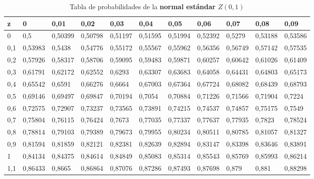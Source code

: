 \documentclass[addpoints,spanish, 12pt,a4paper]{exam}
\begin{document}
\begin{questions}

\end{questions}

\begin{table}
\centering

\caption{Tabla de probabilidades de la \textbf{normal estándar $Z(0,1)$}}
\label{my-label}

\begin{tabular}{l|llllllllll}
z   & 0       & 0,01    & 0,02    & 0,03    & 0,04    & 0,05    & 0,06    & 0,07    & 0,08    & 0,09    \\
\hline
0   & 0,5     & 0,50399 & 0,50798 & 0,51197 & 0,51595 & 0,51994 & 0,52392 & 0,5279  & 0,53188 & 0,53586 \\
0,1 & 0,53983 & 0,5438  & 0,54776 & 0,55172 & 0,55567 & 0,55962 & 0,56356 & 0,56749 & 0,57142 & 0,57535 \\
0,2 & 0,57926 & 0,58317 & 0,58706 & 0,59095 & 0,59483 & 0,59871 & 0,60257 & 0,60642 & 0,61026 & 0,61409 \\
0,3 & 0,61791 & 0,62172 & 0,62552 & 0,6293  & 0,63307 & 0,63683 & 0,64058 & 0,64431 & 0,64803 & 0,65173 \\
0,4 & 0,65542 & 0,6591  & 0,66276 & 0,6664  & 0,67003 & 0,67364 & 0,67724 & 0,68082 & 0,68439 & 0,68793 \\
0,5 & 0,69146 & 0,69497 & 0,69847 & 0,70194 & 0,7054  & 0,70884 & 0,71226 & 0,71566 & 0,71904 & 0,7224  \\
0,6 & 0,72575 & 0,72907 & 0,73237 & 0,73565 & 0,73891 & 0,74215 & 0,74537 & 0,74857 & 0,75175 & 0,7549  \\
0,7 & 0,75804 & 0,76115 & 0,76424 & 0,7673  & 0,77035 & 0,77337 & 0,77637 & 0,77935 & 0,7823  & 0,78524 \\
0,8 & 0,78814 & 0,79103 & 0,79389 & 0,79673 & 0,79955 & 0,80234 & 0,80511 & 0,80785 & 0,81057 & 0,81327 \\
0,9 & 0,81594 & 0,81859 & 0,82121 & 0,82381 & 0,82639 & 0,82894 & 0,83147 & 0,83398 & 0,83646 & 0,83891 \\
1   & 0,84134 & 0,84375 & 0,84614 & 0,84849 & 0,85083 & 0,85314 & 0,85543 & 0,85769 & 0,85993 & 0,86214 \\
1,1 & 0,86433 & 0,8665  & 0,86864 & 0,87076 & 0,87286 & 0,87493 & 0,87698 & 0,879   & 0,881   & 0,88298 \\

\end{tabular}
\end{table}
\end{document}
